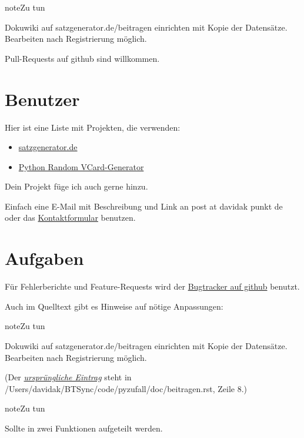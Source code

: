 \documentclass[a4paper,12pt,oneside]{sphinxmanual}
\begin{document}
\begin{notice}{note}{Zu tun}

Dokuwiki auf satzgenerator.de/beitragen einrichten mit Kopie der Datensätze. Bearbeiten nach Registrierung möglich.
\end{notice}

Pull-Requests auf github sind willkommen.


\section{Benutzer}
\label{benutzer::doc}\label{benutzer:benutzer}
Hier ist eine Liste mit Projekten, die {\hyperref[funktionen:module-pyzufall]{}} verwenden:
\begin{itemize}
\item {} 
\href{http://satzgenerator.de/}{satzgenerator.de}

\item {} 
\href{https://github.com/davidak/python-random-vcard-generator}{Python Random VCard-Generator}

\end{itemize}

Dein Projekt füge ich auch gerne hinzu.

Einfach eine E-Mail mit Beschreibung und Link an post at davidak punkt de oder das \href{http://davidak.de/kontakt}{Kontaktformular} benutzen.


\section{Aufgaben}
\label{todo::doc}\label{todo:aufgaben}
Für Fehlerberichte und Feature-Requests wird der \href{https://github.com/davidak/pyzufall/issues}{Bugtracker auf github} benutzt.

Auch im Quelltext gibt es Hinweise auf nötige Anpassungen:

\begin{notice}{note}{Zu tun}

Dokuwiki auf satzgenerator.de/beitragen einrichten mit Kopie der Datensätze. Bearbeiten nach Registrierung möglich.
\end{notice}

(Der {\hyperref[beitragen:index-0]{\emph{ursprüngliche Eintrag}}} steht in /Users/davidak/BTSync/code/pyzufall/doc/beitragen.rst, Zeile 8.)

\begin{notice}{note}{Zu tun}

Sollte in zwei Funktionen aufgeteilt werden.
\end{notice}
\end{document}
